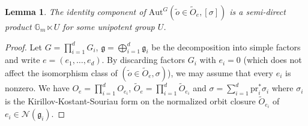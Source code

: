 \documentclass[12pt]{amsart}
\newtheorem{lem}[prop]{Lemma}
\theoremstyle{definition}
\newcommand{\bG}{\mathbb{G}}
\newcommand{\cN}{\mathcal{N}}
\newcommand{\fg}{\mathfrak g}
\newcommand{\Aut}{\mathrm{Aut}}
\numberwithin{equation}{section}
\begin{document}

\begin{lem}\label{l-one dim}
The identity component of $\Aut^G(\tilde{o} \in \widetilde{O}_e,[\sigma])$ is a semi-direct product $\mathbb{G}_m \ltimes U$ for some unipotent group $U$. %
\end{lem}

\begin{proof}
Let $G=\prod_{i=1}^d G_i$, $\fg=\bigoplus_{i=1}^d \fg_i$ be the decomposition into simple factors and write $e=(e_1,\dots,e_d)$. By discarding factors $G_i$ with $e_i=0$ (which does not affect the isomorphism class of $(\tilde{o} \in \widetilde{O}_e,\sigma)$), we may assume that every $e_i$ is nonzero. We have $O_e = \prod_{i=1}^d O_{e_i}$, $\widetilde{O}_e = \prod_{i=1}^d \widetilde{O}_{e_i}$ and $\sigma = \sum_{i=1}^d \mathrm{pr}_i^*\sigma_i$ where $\sigma_i$ is the Kirillov-Kostant-Souriau form on the normalized orbit closure $\widetilde{O}_{e_i}$ of $e_i\in \cN(\fg_i)$.


\end{proof}
\end{document}
